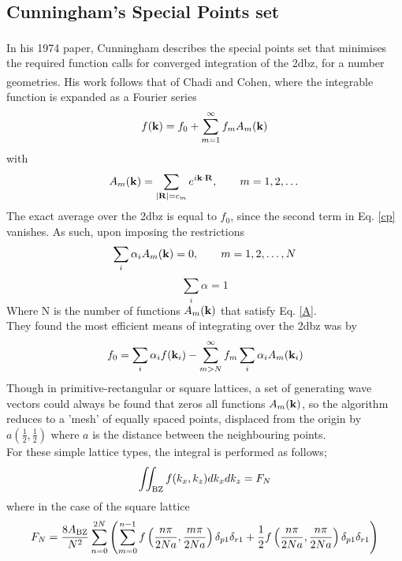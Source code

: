 \documentclass[a4paper, 12pt]{article}
\begin{document}
	\subsection{Cunningham's Special Points set}\label{points}
	In his 1974 paper\textcolor{blue}{\textsuperscript{\cite{CP}}}, Cunningham describes the special points set that minimises the required function calls for converged integration of the \gls{2dbz}, for a number geometries. His work follows that of Chadi and Cohen\textcolor{blue}{\textsuperscript{\cite{CC}}}, where the integrable function is expanded as a Fourier series
	\begin{equation}\label{cp}
		f({\bf k})=f_0 +\sum_{m=1}^\infty f_m A_m({\bf k})
	\end{equation}
	with
	\begin{equation}
		A_m({\bf k})=\sum_{|{\bf R}|=c_m}e^{i\bf k \cdot R},\qquad m=1,2,\dots
	\end{equation}
	The exact average over the \gls{2dbz} is equal to $f_0$, since the second term in Eq. \eqref{cp} vanishes. As such, upon imposing the restrictions
	\begin{equation}\label{A}
		\sum_i \alpha_i A_m({\bf k})=0, \qquad m = 1,2,\dots,N 
	\end{equation}
	\begin{equation}
	\sum_i \alpha = 1	
	\end{equation}
	Where N is the number of functions $A_m({\bf k})$ that satisfy Eq. \eqref{A}.\\
	They found the most efficient means of integrating over the \gls{2dbz} was by
	\begin{equation}
		f_0 = \sum_i \alpha_i f({\bf k}_i) - \sum_{m> N}^\infty f_m \sum_i \alpha_i A_m({\bf k}_i)
	\end{equation}
	Though in primitive-rectangular or square lattices, a set of generating wave vectors could always be found that zeros all functions $A_m({\bf k})$, so the algorithm reduces to a 'mesh' of equally spaced points, displaced from the origin by $a(\frac{1}{2},\frac{1}{2})$ where $a$ is the distance between the neighbouring points.
	\\[2mm] For these simple lattice types, the integral is performed as follows;
	\begin{equation}
		\iint_{\rm BZ}f(k_x, k_z) dk_xdk_z= F_N
	\end{equation}
	where in the case of the square lattice
	\begin{equation}\label{CPsquare}
		F_N =\frac{8A_{\rm BZ}}{N^2}\sum_{n=0}^{2N}\left(\sum_{m=0}^{n-1} f\left(\frac{n\pi}{2Na}, \frac{m\pi}{2Na}\right)\delta_{p 1}\delta_{r 1}+\frac{1}{2}f\left(\frac{n\pi}{2Na}, \frac{n\pi}{2Na}\right)\delta_{p 1}\delta_{r 1}\right)
	\end{equation}
\end{document}
